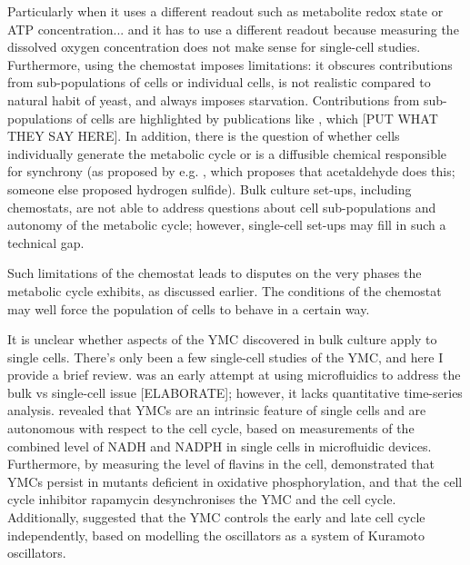Particularly when it uses a different readout such as metabolite redox state or ATP concentration... and it has to use a different readout because measuring the dissolved oxygen concentration does not make sense for single-cell studies.
Furthermore, using the chemostat imposes limitations: it obscures contributions from sub-populations of cells or individual cells, is not realistic compared to natural habit of yeast, and always imposes starvation.
Contributions from sub-populations of cells are highlighted by publications like \citet{burnettiCellCycleStart2016}, which [PUT WHAT THEY SAY HERE].
In addition, there is the question of whether cells individually generate the metabolic cycle or is a diffusible chemical responsible for synchrony (as proposed by e.g. \citet{krishnaMinimalPushPull2018}, which proposes that acetaldehyde does this; someone else proposed hydrogen sulfide).
Bulk culture set-ups, including chemostats, are not able to address questions about cell sub-populations and autonomy of the metabolic cycle; however, single-cell set-ups may fill in such a technical gap.

Such limitations of the chemostat leads to disputes on the very phases the metabolic cycle exhibits, as discussed earlier.
The conditions of the chemostat may well force the population of cells to behave in a certain way.

It is unclear whether aspects of the YMC discovered in bulk culture apply to single cells.
There's only been a few single-cell studies of the YMC, and here I provide a brief review.
\citet{laxmanBehaviorMetabolicCycling2010} was an early attempt at using microfluidics to address the bulk vs single-cell issue [ELABORATE];
however, it lacks quantitative time-series analysis.
\citet{papagiannakisAutonomousMetabolicOscillations2017} revealed that YMCs are an intrinsic feature of single cells and are autonomous with respect to the cell cycle, based on measurements of the combined level of NADH and NADPH in single cells in microfluidic devices.
Furthermore, by measuring the level of flavins in the cell, \citet{baumgartnerFlavinbasedMetabolicCycles2018} demonstrated that YMCs persist in mutants deficient in oxidative phosphorylation, and that the cell cycle inhibitor rapamycin desynchronises the YMC and the cell cycle.
Additionally, \citet{ozsezenInferenceHighLevelInteraction2019} suggested that the YMC controls the early and late cell cycle independently, based on modelling the oscillators as a system of Kuramoto oscillators.

